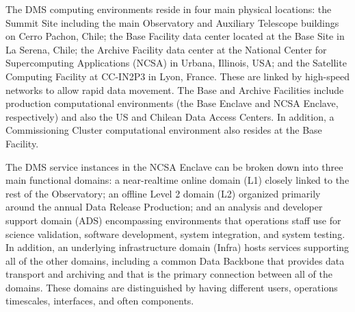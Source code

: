 \documentclass[]{article}
\begin{document}
The DMS computing environments reside in four main physical locations:
the Summit Site including the main Observatory and Auxiliary Telescope
buildings on Cerro Pachon, Chile; the Base Facility data center located
at the Base Site in La Serena, Chile; the Archive Facility data center
at the National Center for Supercomputing Applications (NCSA) in Urbana,
Illinois, USA; and the Satellite Computing Facility at CC-IN2P3 in Lyon,
France. These are linked by high-speed networks to allow rapid data
movement. The Base and Archive Facilities include production
computational environments (the Base Enclave and NCSA Enclave,
respectively) and also the US and Chilean Data Access Centers. In
addition, a Commissioning Cluster computational environment also resides
at the Base Facility.

The DMS service instances in the NCSA Enclave can be broken down into
three main functional domains: a near-realtime online domain (L1)
closely linked to the rest of the Observatory; an offline Level 2 domain
(L2) organized primarily around the annual Data Release Production; and
an analysis and developer support domain (ADS) encompassing environments
that operations staff use for science validation, software development,
system integration, and system testing. In addition, an underlying
infrastructure domain (Infra) hosts services supporting all of the other
domains, including a common Data Backbone that provides data transport
and archiving and that is the primary connection between all of the
domains. These domains are distinguished by having different users,
operations timescales, interfaces, and often components.
\end{document}
